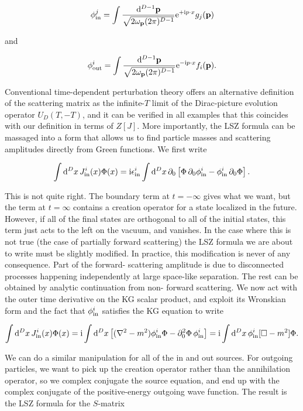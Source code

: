 \[
\phi^j_{\rm in}=\int\frac{\mathop{}\!\mathrm{d}^{D-1}\mathbf p}{\sqrt{2\omega_{\mathbf p}(2\pi)^{D-1}}}\mathrm{e}^{+\mathrm{i} p\mathbin{\cdot}x}g_j(\mathbf p)
\]

and

\[
\phi^i_{\rm out}=\int\frac{\mathop{}\!\mathrm{d}^{D-1}\mathbf p}{\sqrt{2\omega_{\mathbf p}(2\pi)^{D-1}}}\mathrm{e}^{-\mathrm{i} p\mathbin{\cdot}x}f_i(\mathbf p).
\]

Conventional time-dependent perturbation theory offers an alternative definition
of the scattering matrix as the infinite-$T$ limit of the Dirac-picture evolution operator
$U_D(T,-T)$, and it can be verified in all examples that this coincides with our definition
in terms of $Z[J]$. More importantly, the LSZ formula can be massaged into a form
that allows us to find particle masses and scattering amplitudes directly from Green
functions. We first write

\[
\int\mathop{}\!\mathrm{d}^D x\,J^i_{\rm in}(x)\Phi(x)=\mathrm{i}\epsilon^i_{\rm in}\int\mathop{}\!\mathrm{d}^D x\,\partial_0\left[\Phi\,\partial_0\phi^i_{\rm in}-\phi^i_{\rm in}\,\partial_0\Phi\right].
\]

This is not quite right. The boundary term at $t=-\infty$ gives what we want, but the
term at $t=\infty$ contains a creation operator for a state localized in the future. However,
if all of the final states are orthogonal to all of the initial states, this term just acts to
the left on the vacuum, and vanishes. In the case where this is not true (the case of
partially forward scattering) the LSZ formula we are about to write must be slightly
modified. In practice, this modification is never of any consequence. Part of the forward-
scattering amplitude is due to disconnected processes happening independently at large
space-like separation. The rest can be obtained by analytic continuation from non-
forward scattering. We now act with the outer time derivative on the KG scalar product,
and exploit its Wronskian form and the fact that $\phi^i_{\rm in}$ satisfies the KG equation to
write

\[
\int\mathop{}\!\mathrm{d}^D x\,J^i_{\rm in}(x)\Phi(x)=\mathrm{i}\int\mathop{}\!\mathrm{d}^D x\left[(\nabla^2-m^2)\phi^i_{\rm in}\Phi-\partial_0^2\Phi\,\phi^i_{\rm in}\right]
=\mathrm{i}\int\mathop{}\!\mathrm{d}^D x\,\phi^i_{\rm in}[\Box-m^2]\Phi.
\]

We can do a similar manipulation for all of the in and out sources. For outgoing
particles, we want to pick up the creation operator rather than the annihilation operator,
so we complex conjugate the source equation, and end up with the complex conjugate
of the positive-energy outgoing wave function. The result is the LSZ formula for the
$S$-matrix

